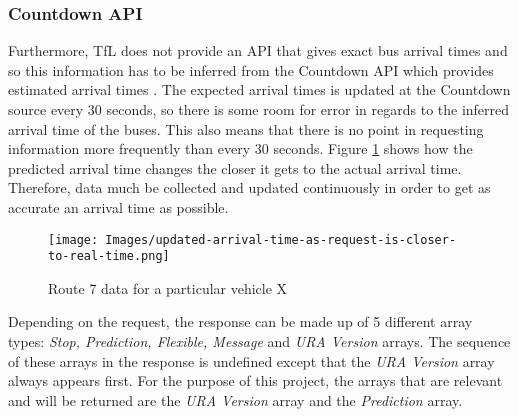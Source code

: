 \documentclass[12pt, a4paper]{article}
\begin{document}
\subsubsection{Countdown API}

Furthermore, TfL does not provide an API that gives exact bus arrival times and so this information has to be inferred from the Countdown API which provides estimated arrival times \cite{tfl-api}. The expected arrival times is updated at the Countdown source every 30 seconds, so there is some room for error in regards to the inferred arrival time of the buses. This also means that there is no point in requesting information more frequently than every 30 seconds. Figure \ref{fig:more-accurate-closer-to-eta} shows how the predicted arrival time changes the closer it gets to the actual arrival time. Therefore, data much be collected and updated continuously in order to get as accurate an arrival time as possible.

\begin{figure}[H]
\begin{center}
    \texttt{[image: Images/updated-arrival-time-as-request-is-closer-to-real-time.png]}
    \caption{Route 7 data for a particular vehicle X}
    \label{fig:more-accurate-closer-to-eta}
\end{center}
\end{figure}

Depending on the request, the response can be made up of 5 different array types: \textit{Stop, Prediction, Flexible, Message} and \textit{URA Version} arrays. The sequence of these arrays in the response is undefined except that the \textit{URA Version} array always appears first. For the purpose of this project, the arrays that are relevant and will be returned are the \textit{URA Version} array and the \textit{Prediction} array. \\
\end{document}
